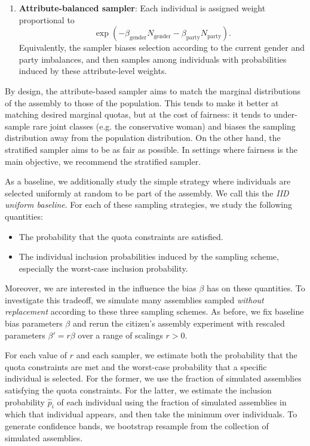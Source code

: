 \begin{subappendices}
\begin{enumerate}
    \item \textbf{Attribute-balanced sampler}: Each individual is assigned weight proportional to
    \[
        \exp\left(
            -\beta_{\mathrm{gender}} N_{\mathrm{gender}}
            -\beta_{\mathrm{party}} N_{\mathrm{party}}
        \right).
    \]
    Equivalently, the sampler biases selection according to the current gender and party imbalances, and then samples among individuals with probabilities induced by these attribute-level weights.
\end{enumerate}

By design, the attribute-based sampler aims to match the marginal distributions of the assembly to those of the population. This tends to make it better at matching desired marginal quotas, but at the cost of fairness: it tends to under-sample rare joint classes (e.g. the conservative woman) and biases the sampling distribution away from the population distribution. On the other hand, the stratified sampler aims to be as fair as possible. In settings where fairness is the main objective, we recommend the stratified sampler.



As a baseline, we additionally study the simple strategy where individuals are selected uniformly at random to be part of the assembly. We call this the \textit{IID uniform baseline}. For each of these sampling strategies, we study the following quantities:

\begin{itemize}
    \item The probability that the quota constraints are satisfied.
    \item The individual inclusion probabilities induced by the sampling scheme, especially the worst-case inclusion probability.

\end{itemize}

 Moreover, we are interested in the influence the bias $\beta$ has on these 
 quantities. To investigate this tradeoff, we simulate many assemblies sampled 
 \textit{without replacement} according to these three sampling schemes. As before, we 
 fix baseline bias parameters $\beta$ and rerun the citizen's assembly experiment with 
 rescaled parameters $\beta' = r\beta$ over a range of scalings $r > 0$.

For each value of $r$ and each sampler, we estimate both the probability that the quota
 constraints are met and the worst-case probability that a specific individual is selected. 
 For the former, we use the fraction of simulated assemblies satisfying the quota constraints. 
 For the latter, we estimate the inclusion probability $\hat p_i$ of each individual
  using the fraction of simulated assemblies in which that individual appears, and then
   take the minimum over individuals. To generate confidence bands, we bootstrap resample 
   from the collection of simulated assemblies.


\end{subappendices}
